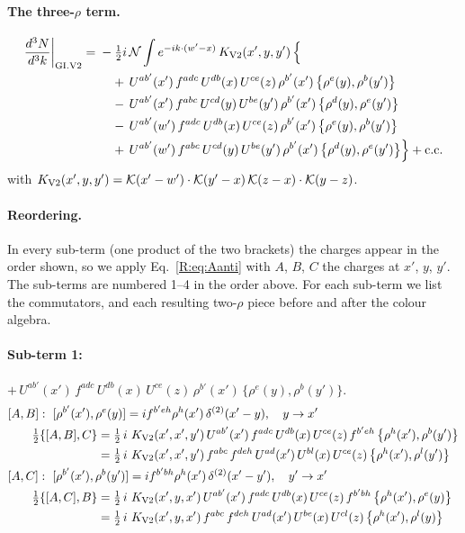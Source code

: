 \documentclass[10pt]{article}
\numberwithin{equation}{section}
\newcommand{\KK}{\mathcal K}
\newcommand{\NN}{\mathcal N}
\begin{document}
\paragraph{The three-$\rho$ term.}
\begin{align}
\frac{d^3N}{d^3k}\bigg|_{\rm GI.V2}={}&-\tfrac12i\,\NN\int e^{-ik\cdot(w'-x)}\,K_{\rm V2}(x',y,y')\,\Big\{\notag\\
&\quad +\,U^{ab'}(x')\,f^{adc}\,U^{db}(x)\,U^{ce}(z)\,\rho^{b'}(x')\,\big\{\rho^{e}(y),\rho^{b}(y')\big\}\notag\\
&\quad -\,U^{ab'}(x')\,f^{abc}\,U^{cd}(y)\,U^{be}(y')\,\rho^{b'}(x')\,\big\{\rho^{d}(y),\rho^{e}(y')\big\}\notag\\
&\quad -\,U^{ab'}(w')\,f^{adc}\,U^{db}(x)\,U^{ce}(z)\,\rho^{b'}(x')\,\big\{\rho^{e}(y),\rho^{b}(y')\big\}\notag\\
&\quad +\,U^{ab'}(w')\,f^{abc}\,U^{cd}(y)\,U^{be}(y')\,\rho^{b'}(x')\,\big\{\rho^{d}(y),\rho^{e}(y')\big\}\Big\}+{\rm c.c.}\label{R:eq:in-GI.V2}
\end{align}
with $K_{\rm V2}(x',y,y')=\KK(x'-w')\cdot\KK(y'-x)\,\KK(z-x)\cdot\KK(y-z)$.
\paragraph{Reordering.} In every sub-term (one product of the two brackets) the charges appear in the order shown, so we apply Eq.~\eqref{R:eq:Aanti} with $A$, $B$, $C$ the charges at $x'$, $y$, $y'$. The sub-terms are numbered 1--4 in the order above. For each sub-term we list the commutators, and each resulting two-$\rho$ piece before and after the colour algebra.
\paragraph{Sub-term 1:} $+\,U^{ab'}(x')\,f^{adc}\,U^{db}(x)\,U^{ce}(z)\,\rho^{b'}(x')\,\big\{\rho^{e}(y),\rho^{b}(y')\big\}$.
\begin{align}
&[A,B]:\ [\rho^{b'}(x'),\rho^{e}(y)]=i f^{b'eh}\rho^{h}(x')\,\delta^{(2)}(x'-y),\quad y\to x'\notag\\
&\qquad \tfrac12\{[A,B],C\}=\tfrac12\,i\,\,K_{\rm V2}(x',x',y')\,U^{ab'}(x')\,f^{adc}\,U^{db}(x)\,U^{ce}(z)\,f^{b'eh}\,\big\{\rho^{h}(x'),\rho^{b}(y')\big\}\notag\\
&\qquad\phantom{\tfrac12\{[A,B],C\}}=\tfrac12\,i\,\,K_{\rm V2}(x',x',y')\,f^{abc}\,f^{deh}\,U^{ad}(x')\,U^{bl}(x)\,U^{ce}(z)\,\big\{\rho^{h}(x'),\rho^{l}(y')\big\}
\label{R:eq:GI.V2-1-AB}\\
&[A,C]:\ [\rho^{b'}(x'),\rho^{b}(y')]=i f^{b'bh}\rho^{h}(x')\,\delta^{(2)}(x'-y'),\quad y'\to x'\notag\\
&\qquad \tfrac12\{[A,C],B\}=\tfrac12\,i\,\,K_{\rm V2}(x',y,x')\,U^{ab'}(x')\,f^{adc}\,U^{db}(x)\,U^{ce}(z)\,f^{b'bh}\,\big\{\rho^{h}(x'),\rho^{e}(y)\big\}\notag\\
&\qquad\phantom{\tfrac12\{[A,C],B\}}=\tfrac12\,i\,\,K_{\rm V2}(x',y,x')\,f^{abc}\,f^{deh}\,U^{ad}(x')\,U^{be}(x)\,U^{cl}(z)\,\big\{\rho^{h}(x'),\rho^{l}(y)\big\}
\label{R:eq:GI.V2-1-AC}
\end{align}
\end{document}
